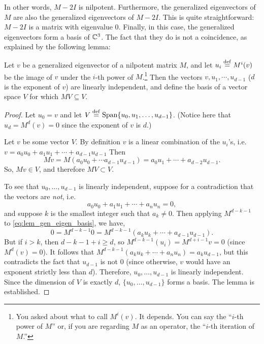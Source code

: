 In other words, $M - 2I$ is nilpotent. Furthermore, the generalized
eigenvectors of $M$ are also the generalized eigenvectors of $M - 2I$.
This is quite straightforward: $M - 2I$ is a matrix with 
eigenvalue $0$. Finally, in this case, the generalized eigenvectors
form a basis of $\mathbb{C}^3$. The fact that they do is not a coincidence, as
explained by the following lemma:

\begin{lem}\label{lem:gen_eigen_basis}
Let $v$ be a generalized eigenvector of a nilpotent matrix $M$, and
let $u_i \stackrel{\mathrm{def}}{=} M^i(v)$ be the image of $v$ under the $i$-th power of 
$M$.\footnote{You asked about what to call $M^i(v)$.
It depends. You can say the ``$i$-th power of $M$'' or, if you are regarding
$M$ as an operator, the ``$i$-th iteration of $M$.''} Then the vectors $v, u_1,
\cdots,u_{d - 1}$ ($d$ is the exponent of $v$) are linearly 
independent, and define the basis of a vector space $V$ for which 
$MV \subseteq V$.
\end{lem}
\begin{proof}
Let $u_0 = v$ and let $V \stackrel{\mathrm{def}}{=} \mathrm{Span}\{u_0, u_1,\dots,u_{d - 1}\}$.
(Notice here that $u_d = M^d(v) = 0$ since the exponent of $v$ is
$d$.)

Let $v$ be some vector $V$. By definition $v$ is a linear 
combination of the $u_i$'s, i.e. $v = a_0u_0 + a_1u_1 +\cdots+
a_{d - 1}u_{d - 1}$
Then
\[
Mv = M(a_0u_0 + \cdots a_{d - 1}u_{d - 1}) = a_0u_1 + \cdots + a_{d - 2}u_{d - 1}.
\]
So, $Mv \in V$, and therefore $MV \subset V$.

To see that $u_0,\dots,u_{d - 1}$ is linearly independent, suppose
for a contradiction that the vectors are \emph{not}, i.e.
\begin{equation}\label{eq:lem_gen_eigen_basis}
a_0u_0 + a_1u_1 + \cdots + a_nu_n = 0,
\end{equation}
and suppose $k$ is the smallest integer such that $a_k \neq 0$.
Then applying $M^{d - k - 1}$ to \eqref{eq:lem_gen_eigen_basis},
we have,
\[
0 = M^{d - k - 1}0 = M^{d - k - 1}(a_ku_k + \cdots + a_{d - 1}u_{d - 1}).
\]
But if $i > k$, then $d - k - 1 + i \geq d$, so $M^{d - k - 
1}(u_i) = M^{d + i - 1}v = 0$ (since $M^d(v) = 0$). It follows
that $M^{d - k - 1}(a_ku_k + \cdots + a_nu_n) = a_ku_{d - 1}$,
but this contradicts the fact that $u_{d - 1}$ is not $0$ (since 
otherwise, $v$ would have an exponent strictly less than $d$). 
Therefore, $u_0, \dots,u_{d - 1}$ is linearly independent. Since the
dimension of $V$ is exactly $d$, $\{u_0,\dots,u_{d - 1}\}$ forms 
a basis. The lemma is established.
\end{proof}


